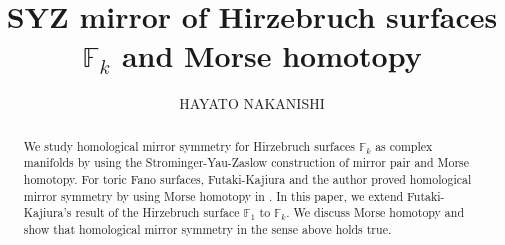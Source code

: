 \documentclass[12pt,reqno]{amsart}
\theoremstyle{definition}
\begin{document}
\title{SYZ mirror of Hirzebruch surfaces $\mathbb{F}_k$ and Morse homotopy}
\author{HAYATO NAKANISHI}
\address{Department of Mathematics and Informatics, Graduate School of Science and Engineering, Chiba University, 1-33
Yayoicho, Inage, Chiba, 263-8522 Japan.}
\date{}

\maketitle

\begin{abstract}
We study homological mirror symmetry for Hirzebruch surfaces $\mathbb{F}_k$ as complex manifolds by using the Strominger-Yau-Zaslow construction of mirror pair and Morse homotopy. For  toric Fano surfaces, Futaki-Kajiura and the author proved homological mirror symmetry by using Morse homotopy in \cite{fut-kaj1,fut-kaj2,HN}. In this paper, we extend Futaki-Kajiura's result of the Hirzebruch surface $\mathbb{F}_1$ to $\mathbb{F}_k$. We discuss Morse homotopy and show that homological mirror symmetry in the sense above holds true.
\end{abstract} 

\tableofcontents
\end{document}

